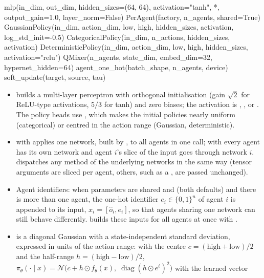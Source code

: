 \begin{pycode}
mlp(in_dim, out_dim, hidden_sizes=(64, 64), activation="tanh", *,
    output_gain=1.0, layer_norm=False)
PerAgent(factory, n_agents, shared=True)
GaussianPolicy(in_dim, action_dim, low, high, hidden_sizes, activation,
               log_std_init=-0.5)
CategoricalPolicy(in_dim, n_actions, hidden_sizes, activation)
DeterministicPolicy(in_dim, action_dim, low, high, hidden_sizes,
                    activation="relu")
QMixer(n_agents, state_dim, embed_dim=32, hypernet_hidden=64)
agent_one_hot(batch_shape, n_agents, device)
soft_update(target, source, tau)
\end{pycode}

\begin{itemize}
  \item {} builds a multi-layer perceptron with orthogonal
    initialisation (gain $\sqrt{2}$ for ReLU-type activations, $5/3$ for
    tanh) and zero biases; the activation is , ,
     or . The policy heads use
    , which makes the initial policies nearly uniform
    (categorical) or centred in the action range (Gaussian, deterministic).
  \item {} with  applies one network, built by
    , to all agents in one call; with 
    every agent has its own network and agent $i$'s slice of the input goes
    through network $i$.  dispatches any method
    of the underlying networks in the same way (tensor arguments are sliced
    per agent, others, such as a , are passed
    unchanged).
  \item Agent identifiers: when parameters are shared and
     (both defaults) and there is more than one agent,
    the one-hot identifier $e_i \in \{0, 1\}^n$ of agent $i$ is appended to
    its input, $x_i = [\hat o_i, e_i]$, so that agents sharing one network can
    still behave differently.  builds these
    inputs for all agents at once with .
  \item {} is a diagonal Gaussian with a state-independent
    standard deviation, expressed in units of the action range: with the
    centre $c = (\text{high} + \text{low})/2$ and the half-range
    $h = (\text{high} - \text{low})/2$,
    $\pi_\theta(\cdot \mid x) = \mathcal{N}\bigl(c + h \odot f_\theta(x),\;
    \operatorname{diag}(h \odot e^{\ell})^2\bigr)$ with the learned vector

\end{itemize}

